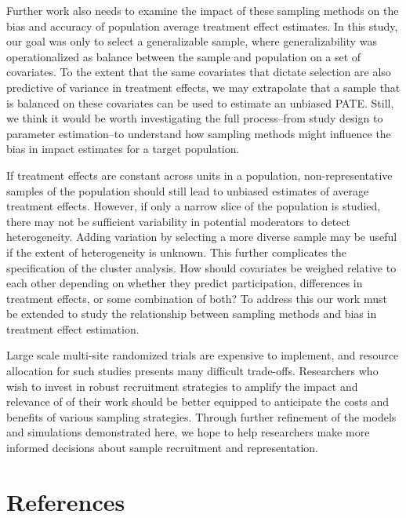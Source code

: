 \documentclass[
  english,
  man,floatsintext]{apa6}
\begin{document}
Further work also needs to examine the impact of these sampling methods on the bias and accuracy of population average treatment effect estimates. In this study, our goal was only to select a generalizable sample, where generalizability was operationalized as balance between the sample and population on a set of covariates. To the extent that the same covariates that dictate selection are also predictive of variance in treatment effects, we may extrapolate that a sample that is balanced on these covariates can be used to estimate an unbiased PATE. Still, we think it would be worth investigating the full process--from study design to parameter estimation--to understand how sampling methods might influence the bias in impact estimates for a target population.

If treatment effects are constant across units in a population, non-representative samples of the population should still lead to unbiased estimates of average treatment effects. However, if only a narrow slice of the population is studied, there may not be sufficient variability in potential moderators to detect heterogeneity. Adding variation by selecting a more diverse sample may be useful if the extent of heterogeneity is unknown. This further complicates the specification of the cluster analysis. How should covariates be weighed relative to each other depending on whether they predict participation, differences in treatment effects, or some combination of both? To address this our work must be extended to study the relationship between sampling methods and bias in treatment effect estimation.

Large scale multi-site randomized trials are expensive to implement, and resource allocation for such studies presents many difficult trade-offs. Researchers who wish to invest in robust recruitment strategies to amplify the impact and relevance of of their work should be better equipped to anticipate the costs and benefits of various sampling strategies. Through further refinement of the models and simulations demonstrated here, we hope to help researchers make more informed decisions about sample recruitment and representation.

\newpage

\hypertarget{references}{%
\section{References}\label{references}}
\end{document}
